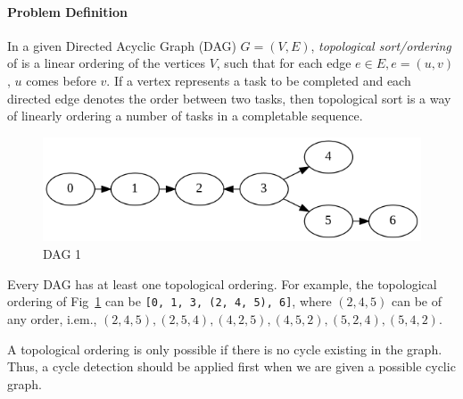 \documentclass[../main.tex]{subfiles}
\begin{document}
\paragraph{Problem Definition} In  a given Directed Acyclic Graph (DAG) $G=(V, E)$, \textit{topological sort/ordering} of is a linear ordering of the vertices $V$, such that for each edge $e \in E, e = (u, v)$, $u$ comes before $v$. If a vertex represents a task to be completed and each directed edge denotes the order between two tasks, then topological sort is a way of linearly ordering a number of tasks in a completable sequence. 
\begin{figure}[h]
    \centering
    \includegraphics[width=0.7\columnwidth]{fig/chapter_advanced_graph/ts_2.png}
    \caption{DAG 1}
    \label{fig:dag_1}
\end{figure}

Every DAG has at least one topological ordering. For example, the topological ordering of Fig~\ref{fig:dag_1} can be \texttt{[0, 1, 3, (2, 4, 5), 6]}, where $(2, 4, 5)$  can be of any order, i.em., $(2, 4, 5), (2, 5, 4), (4, 2, 5), (4, 5, 2), (5, 2, 4), (5, 4, 2)$.

A topological ordering is only possible if there is no cycle existing in the graph. Thus, a cycle detection should be applied first when we are given a possible cyclic graph. 

\end{document}
